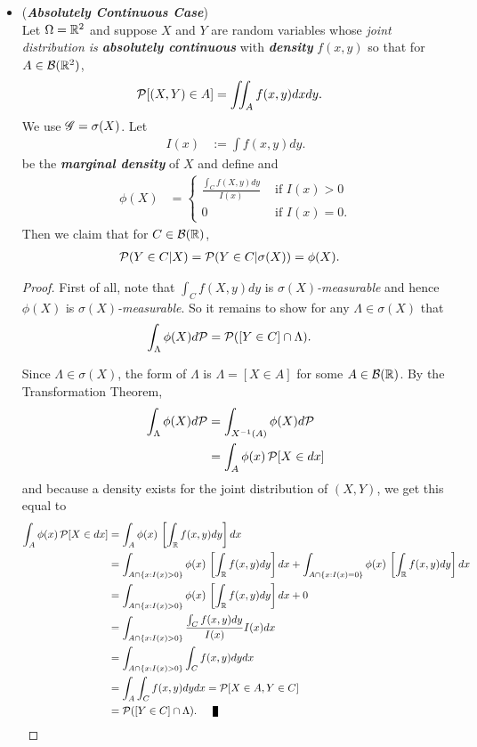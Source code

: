 \documentclass[11pt]{article}
\begin{document}
\begin{itemize}
\item \begin{example} (\emph{\textbf{Absolutely Continuous Case}})\\
Let $\Omega = {\mathbb R}^2$ and suppose $X$ and $Y$ are random variables whose \emph{joint distribution is \textbf{absolutely continuous}} with \emph{\textbf{density}} $f(x, y)$ so that for $A \in {\mathcal B}({\mathbb R}^2)$,
\begin{align*}
{\mathcal P}[(X, Y) \in A] &= \iint_{A} f(x, y) dx dy.
\end{align*} We use ${\mathscr G} = \sigma(X)$. Let
\begin{align*}
I(x) &:= \int f(x, y) dy.
\end{align*}
be the \emph{\textbf{marginal density}} of $X$ and define and
\begin{align*}
\phi(X) &=\left\{
\begin{array}{cc}
\frac{\int_{C} f(X, y) dy}{I(x)} &\text{ if } I(x) > 0\\
0 &\text{ if } I(x) = 0.
\end{array}
 \right.
\end{align*} Then we claim that for $C \in {\mathcal B}({\mathbb R})$,
\begin{align*}
{\mathcal P}(Y \in C | X ) = {\mathcal P}(Y \in C | \sigma(X) ) &= \phi(X).
\end{align*}
\end{example}
\begin{proof}
First of all, note that $\int_{C} f(X, y) dy$ is \emph{$\sigma(X)$-measurable} and hence $\phi(X)$ is \emph{$\sigma(X)$-measurable}. So it remains to show for any $\Lambda \in \sigma(X)$ that
\begin{align*}
\int_{\Lambda} \phi(X) d{\mathcal P} &= {\mathcal P}([Y \in C] \cap \Lambda).
\end{align*}

Since $\Lambda \in \sigma(X)$, the form of $\Lambda$ is $\Lambda = [X \in A]$ for some $A \in {\mathcal B}({\mathbb R})$. By the Transformation Theorem,
\begin{align*}
\int_{\Lambda} \phi(X) d{\mathcal P} &= \int_{X^{-1}(A)} \phi(X) d{\mathcal P}\\
&= \int_{A} \phi(x)\, {\mathcal P}[X \in dx]
\end{align*}
and because a density exists for the joint distribution of $(X, Y)$, we get this equal to
\begin{align*}
\int_{A} \phi(x)\, \cP[X \in dx] &=\int_{A} \phi(x)\, \brac{\int_{\bR}f(x, y) dy} dx \\
&= \int_{A \cap \{x: I(x) > 0\}} \phi(x)\, \brac{\int_{\bR}f(x, y) dy} dx + \int_{A \cap \{x: I(x) = 0\}} \phi(x)\, \brac{\int_{\bR}f(x, y) dy} dx\\
&= \int_{A \cap \{x: I(x) > 0\}} \phi(x)\, \brac{\int_{\bR}f(x, y) dy} dx  + 0\\
&= \int_{A \cap \{x: I(x) > 0\}} \frac{\int_{C} f(x, y) dy}{I(x)} I(x) dx \\
&= \int_{A \cap \{x: I(x) > 0\}} \int_{C} f(x, y) dy  dx\\
&= \int_{A } \int_{C} f(x, y) dy  dx = \cP[X \in A, Y \in C]\\
&= \cP([Y \in C] \cap \Lambda). \qed
\end{align*}
\end{proof}


\end{itemize}
\end{document}
